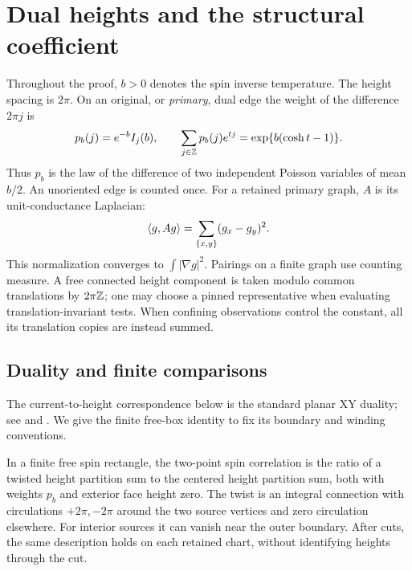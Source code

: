 \section{Dual heights and the structural coefficient}\label{sec:heights}

Throughout the proof, \(b>0\) denotes the spin inverse temperature.
The height spacing is \(2\pi\). On an original, or \emph{primary}, dual
edge the weight of the difference \(2\pi j\) is
\[
 p_b(j)=e^{-b}I_j(b),\qquad
 \sum_{j\in\mathbb Z}p_b(j)e^{tj}=\exp\{b(\cosh t-1)\}.
\]
Thus \(p_b\) is the law of the difference of two independent
Poisson variables of mean \(b/2\). An unoriented edge is counted once.
For a retained primary graph, \(A\) is its unit-conductance Laplacian:
\[
 \langle g,Ag\rangle=\sum_{\{x,y\}}(g_x-g_y)^2.
\]
This normalization converges to \(\int|\nabla g|^2\).
Pairings on a finite graph use counting measure.
A free connected height component is taken modulo common translations
by \(2\pi\mathbb Z\); one may choose a pinned representative when evaluating
translation-invariant tests. When confining observations control the
constant, all its translation copies are instead summed.

\subsection{Duality and finite comparisons}

The current-to-height correspondence below is the standard planar
XY duality; see \cite[Section~2]{vEL} and
\cite{vanEngelenburgLisDuality2025}. We give the finite free-box
identity to fix its boundary and winding conventions.

\begin{lemma}\label{lem:duality}
In a finite free spin rectangle, the two-point spin correlation is
the ratio of a twisted height partition sum to the centered height
partition sum, both with weights \(p_b\) and exterior face height zero.
The twist is an integral connection with circulations \(+2\pi,-2\pi\)
around the two source vertices and zero circulation elsewhere.
For interior sources it can vanish near the outer boundary.
After cuts, the same description holds on each retained chart, without
identifying heights through the cut.
\end{lemma}

